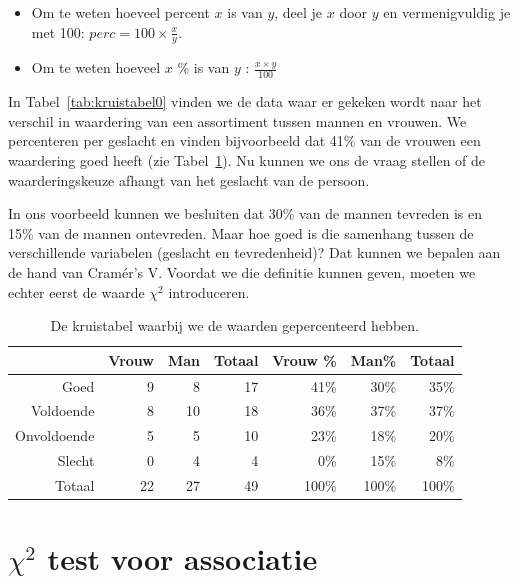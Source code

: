 \begin{itemize}
  \item Om te weten hoeveel percent $x$ is van $y$, deel je $x$ door $y$ en vermenigvuldig je met 100: $perc = 100 \times \frac{x}{y}$.
  \item Om te weten hoeveel $x$ \% is van $y$ : $ \frac{x \times y}{100}$
\end{itemize}

\begin{example}
  \label{vb:kruistabel}
  In Tabel~\ref{tab:kruistabel0} vinden we de data waar er gekeken wordt naar het verschil in waardering van een assortiment tussen mannen en vrouwen. We percenteren per geslacht en vinden bijvoorbeeld dat 41\% van de vrouwen een waardering goed heeft (zie Tabel~\ref{tab:kruistabel1}). Nu kunnen we ons de vraag stellen of de waarderingskeuze afhangt van het geslacht van de persoon.
\end{example}

In ons voorbeeld kunnen we besluiten dat 30\% van de mannen tevreden is en 15\% van de mannen ontevreden. Maar hoe goed is die samenhang tussen de verschillende variabelen (geslacht en tevredenheid)? Dat kunnen we bepalen aan de hand van Cramér's V. Voordat we die definitie kunnen geven, moeten we echter eerst de waarde $\chi^2$ introduceren.

\begin{table} \centering
  \begin{tabular}{@{}rrrrrrr@{}} \toprule
    & Vrouw & Man & Totaal & Vrouw \% & Man\%   & Totaal  \\ \midrule
    Goed        & 9     & 8   & 17     & 41\%  & 30\% & 35\% \\
    Voldoende   & 8     & 10  & 18     & 36\%  & 37\%    & 37\% \\
    Onvoldoende & 5     & 5   & 10     & 23\%  & 18\% & 20\% \\
    Slecht      & 0     & 4   & 4      & 0\%      & 15\% & 8\%  \\
    Totaal      & 22    & 27  & 49     & 100\%    & 100\%   & 100\%   \\
    \bottomrule
  \end{tabular}
  \caption{De kruistabel waarbij we de waarden gepercenteerd hebben.}
  \label{tab:kruistabel1}
\end{table}

\section{\texorpdfstring{$\chi^{2}$}{chi-kwadraat} test voor associatie}

